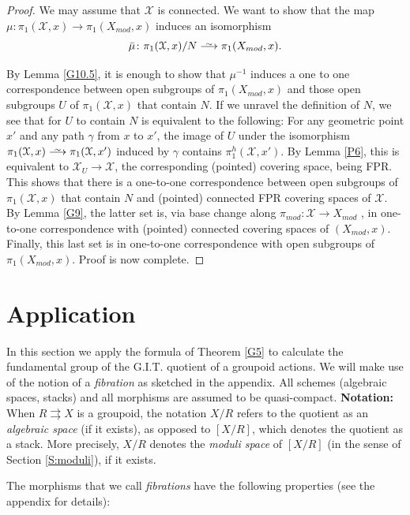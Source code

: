 \documentclass{amsart}
\theoremstyle{definition}
\theoremstyle{remark}
\theoremstyle{remark}
\newcommand{\X}{\mathcal{X}}
\newcommand{\Xm}{X_{mod}}
\newcommand{\st}[1]{\stackrel{#1}{\rightrightarrows}}
\newcommand{\pX}{\pi_1(\X,x)}
\newcommand{\pXm}{\pi_1(\Xm,x)}
\def\smashedlongrightarrow{\setbox0=\hbox{$\longrightarrow$}\ht0=1pt\box0}
\def\risom{\buildrel\sim\over{\smashedlongrightarrow}}
\let\:=\colon
\begin{document}
\begin{proof}
We may assume that $\X$ is connected.  We want to show that the
map $\mu \: \pX \to \pXm$ induces an isomorphism $$\bar{\mu} \:
\pX/N \risom \pXm .$$

By Lemma \ref{G10.5}, it is enough to show that $\mu^{-1}$ induces
a one to one correspondence between open subgroups of $\pXm$ and
those open subgroups $U$ of $\pX$ that contain $N$. If we unravel
the definition of $N$, we see that for $U$ to contain  $N$ is
equivalent to the following: For any geometric point $x'$ and any
path $\gamma$ from  $x$ to $x'$, the image of $U$ under the
isomorphism $\pX \risom \pi_1(\X,x')$ induced by $\gamma$ contains
$\pi_1^{h}(\X,x')$. By Lemma \ref{P6}, this is equivalent to $\X_U
\to \X$, the corresponding (pointed) covering  space, being FPR.
This shows  that there is a one-to-one correspondence between open
subgroups of $\pX$ that contain $N$ and (pointed) connected FPR
covering  spaces of $\X$. By Lemma \ref{G9}, the latter set is,
via base change along $\pi_{mod} \: \X \to \Xm$ , in one-to-one
correspondence with (pointed) connected covering spaces of $(\Xm,
x)$. Finally, this last set is in one-to-one correspondence with
open subgroups of $\pXm$. Proof is now complete.
\end{proof}

\section{Application}{\label{S:application}}

In this section we apply the formula of Theorem \ref{G5} to
calculate the fundamental group of the G.I.T. quotient of a
groupoid actions. We will make use of the notion of a {\em
fibration} as sketched in  the appendix.  All schemes (algebraic
spaces, stacks) and all morphisms are assumed to be quasi-compact.
{\bf Notation:} When $R \st{} X$ is a groupoid, the notation $X/R$
refers to the quotient as an {\em algebraic space} (if it exists),
as opposed to $[X/R]$, which denotes the quotient as a stack. More
precisely, $X/R$ denotes the {\em moduli space} of $[X/R]$ (in the
sense of Section \ref{S:moduli}), if it exists.

The morphisms that we call {\em fibrations} have the following
properties (see the appendix for details):
\end{document}
